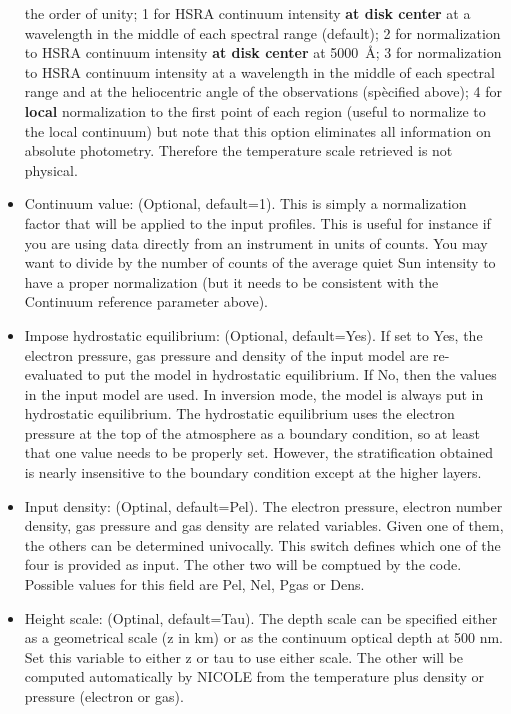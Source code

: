 \begin{itemize}
  the order of unity; 1 for HSRA continuum intensity {\bf at disk
    center} at a wavelength in the middle of each spectral range
  (default); 2 for normalization to HSRA continuum intensity {\bf at
    disk center} at 5000~\AA ; 3 for normalization to HSRA continuum
  intensity at a wavelength in the middle of each spectral range and
  at the heliocentric angle of the observations (spècified above); 4
  for {\bf local} normalization to the first point of each region 
  (useful to normalize to the local continuum) but note that this
  option eliminates all information on absolute photometry. Therefore
  the temperature scale retrieved is not physical.
\item Continuum value: (Optional, default=1). This is simply a
  normalization factor that will be applied to the input
  profiles. This is useful for instance if you are using data
  directly from an instrument in units of counts. You may want to
  divide by the number of counts of the average quiet Sun intensity to
  have a proper normalization (but it needs to be consistent with the
  Continuum reference parameter above).
\item Impose hydrostatic equilibrium: (Optional, default=Yes). If set
  to Yes, the electron pressure, gas pressure and density of the input
  model are re-evaluated to put the model in hydrostatic
  equilibrium. If No, then the values in the input model are used. In
  inversion mode, the model is always put in hydrostatic equilibrium.
  The hydrostatic equilibrium uses the electron pressure at the top of
  the atmosphere as a boundary condition, so at least that one value
  needs to be properly set. However, the stratification obtained is nearly
  insensitive to the boundary condition except at the higher layers.
\item Input density: (Optinal, default=Pel). The electron pressure,
  electron number density, gas pressure and gas density are related
  variables. Given one of them, the others can be determined
  univocally. This switch defines which one of the four is provided
  as input. The other two will be comptued by the code. Possible
  values for this field are Pel, Nel, Pgas or Dens. 
\item Height scale: (Optinal, default=Tau). The depth scale can be
  specified either as a geometrical scale (z in km) or as the
  continuum optical depth at 500 nm. Set this variable to either z or
  tau to use either scale. The other will be computed automatically by
  NICOLE from the temperature plus density or pressure (electron or
  gas). 

\end{itemize}
